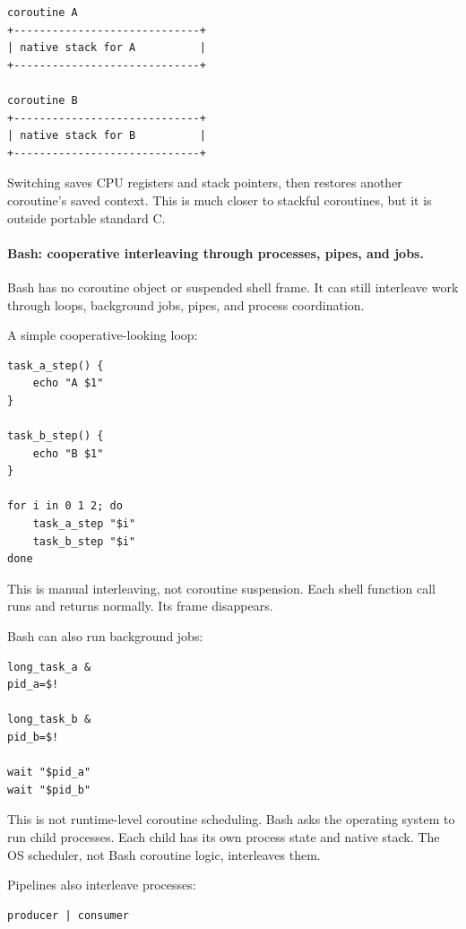 \begin{verbatim}
coroutine A
+-----------------------------+
| native stack for A          |
+-----------------------------+

coroutine B
+-----------------------------+
| native stack for B          |
+-----------------------------+
\end{verbatim}

Switching saves CPU registers and stack pointers, then restores another coroutine's saved context. This is much closer to stackful coroutines, but it is outside portable standard C.

\paragraph{Bash: cooperative interleaving through processes, pipes, and jobs.}

Bash has no coroutine object or suspended shell frame. It can still interleave work through loops, background jobs, pipes, and process coordination.

A simple cooperative-looking loop:

\begin{verbatim}
task_a_step() {
    echo "A $1"
}

task_b_step() {
    echo "B $1"
}

for i in 0 1 2; do
    task_a_step "$i"
    task_b_step "$i"
done
\end{verbatim}

This is manual interleaving, not coroutine suspension. Each shell function call runs and returns normally. Its frame disappears.

Bash can also run background jobs:

\begin{verbatim}
long_task_a &
pid_a=$!

long_task_b &
pid_b=$!

wait "$pid_a"
wait "$pid_b"
\end{verbatim}

This is not runtime-level coroutine scheduling. Bash asks the operating system to run child processes. Each child has its own process state and native stack. The OS scheduler, not Bash coroutine logic, interleaves them.

Pipelines also interleave processes:

\begin{verbatim}
producer | consumer
\end{verbatim}


